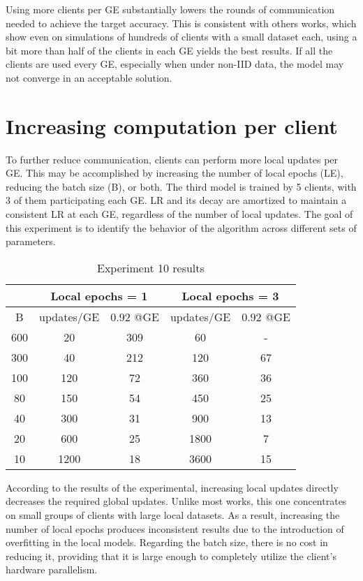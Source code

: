 Using more clients per GE substantially lowers the rounds of communication needed to achieve the target accuracy. This is consistent with others works, which show even on simulations of hundreds of clients with a small dataset each, using a bit more than half of the clients in each GE yields the best results. If all the clients are used every GE, especially when under non-IID data, the model may not converge in an acceptable solution.
    
\section{Increasing computation per client}
To further reduce communication, clients can perform more local updates per GE. This may be accomplished by increasing the number of local epochs (LE), reducing the batch size (B), or both. The third model is trained by 5 clients, with 3 of them participating each GE. LR and its decay are amortized to maintain a consistent LR at each GE, regardless of the number of local updates. The goal of this experiment is to identify the behavior of the algorithm across different sets of parameters.
\begin{table}[H]
    \center
    \begin{tabular}{ | c | c c | c c | }
        \hline
        & \multicolumn{2}{|c|}{Local epochs = 1} & \multicolumn{2}{|c|}{Local epochs = 3} \\\hline
        B & updates/GE &  0.92 @GE & updates/GE &  0.92 @GE\\\hline
        600 & 20 & 309 & 60 & -\\
        300 & 40 & 212 & 120 & 67\\
        100 & 120 & 72 & 360 & 36\\
        80 & 150 & 54 & 450 & 25\\
        40 & 300 & 31 & 900 & 13\\
        20 & 600 & 25 & 1800 & 7\\
        10 & 1200 & 18 & 3600 & 15\\\hline
    \end{tabular}
    \caption[Experiment 10 results]{Experiment 10 results}
\end{table}
According to the results of the experimental, increasing local updates directly decreases the required global updates. Unlike most works, this one concentrates on small groups of clients with large local datasets. As a result, increasing the number of local epochs produces inconsistent results due to the introduction of overfitting in the local models. Regarding the batch size, there is no cost in reducing it, providing that it is large enough to completely utilize the client's hardware parallelism.